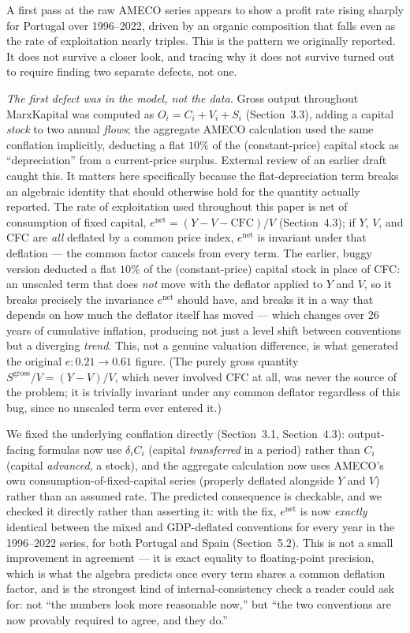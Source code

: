 \documentclass[11pt]{article}
\begin{document}
A first pass at the raw AMECO series appears to show a profit rate rising
sharply for Portugal over 1996--2022, driven by an organic composition
that falls even as the rate of exploitation nearly triples. This is the
pattern we originally reported. It does not survive a closer look, and
tracing why it does not survive turned out to require finding two
separate defects, not one.

\emph{The first defect was in the model, not the data.} Gross output
throughout MarxKapital was computed as $O_i=C_i+V_i+S_i$ (Section~3.3),
adding a capital \emph{stock} to two annual \emph{flows}; the aggregate
AMECO calculation used the same conflation implicitly, deducting a flat
$10\%$ of the (constant-price) capital stock as ``depreciation'' from a
current-price surplus. External review of an earlier draft caught this.
It matters here specifically because the flat-depreciation term breaks
an algebraic identity that should otherwise hold for the quantity
actually reported. The rate of exploitation used throughout this paper
is net of consumption of fixed capital, $e^{\text{net}}=(Y-V-\text{CFC})/V$
(Section~4.3); if $Y$, $V$, and CFC are \emph{all} deflated by a common
price index, $e^{\text{net}}$ is invariant under that deflation --- the
common factor cancels from every term. The earlier, buggy version
deducted a flat $10\%$ of the (constant-price) capital stock in place of
CFC: an unscaled term that does \emph{not} move with the deflator
applied to $Y$ and $V$, so it breaks precisely the invariance
$e^{\text{net}}$ should have, and breaks it in a way that depends on how
much the deflator itself has moved --- which changes over 26 years of
cumulative inflation, producing not just a level shift between
conventions but a diverging \emph{trend}. This, not a genuine valuation
difference, is what generated the original $e:0.21\to0.61$ figure. (The
purely gross quantity $S^{\text{gross}}/V=(Y-V)/V$, which never involved
CFC at all, was never the source of the problem; it is trivially
invariant under any common deflator regardless of this bug, since no
unscaled term ever entered it.)

We fixed the underlying conflation directly (Section~3.1, Section~4.3):
output-facing formulas now use $\delta_iC_i$ (capital \emph{transferred}
in a period) rather than $C_i$ (capital \emph{advanced}, a stock), and
the aggregate calculation now uses AMECO's own consumption-of-fixed-capital
series (properly deflated alongside $Y$ and $V$) rather than an assumed
rate. The predicted consequence is
checkable, and we checked it directly rather than asserting it: with the
fix, $e^{\text{net}}$ is now \emph{exactly} identical between the mixed
and GDP-deflated conventions for every year in the 1996--2022 series,
for both Portugal and Spain (Section~5.2). This is not a small
improvement in agreement --- it is exact equality to floating-point
precision, which is what the algebra predicts once every term shares a
common deflation factor, and is the strongest kind
of internal-consistency check a reader could ask for: not ``the numbers
look more reasonable now,'' but ``the two conventions are now provably
required to agree, and they do.''
\end{document}
